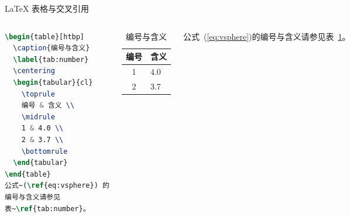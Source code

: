 \documentclass[aspectratio=169]{beamer}
\begin{document}
\begin{frame}[fragile]{\LaTeX{} 表格与交叉引用}
    \begin{columns}[c,onlytextwidth]
\begin{lstlisting}[language=TeX,basicstyle=\ttfamily\footnotesize]
\begin{table}[htbp]
  \caption{编号与含义}
  \label{tab:number}
  \centering
  \begin{tabular}{cl}
    \toprule
    编号 & 含义 \\
    \midrule
    1 & 4.0 \\
    2 & 3.7 \\
    \bottomrule
  \end{tabular}
\end{table}
公式~(\ref{eq:vsphere}) 的
编号与含义请参见
表~\ref{tab:number}。
\end{lstlisting}
        \begin{table}[htpb]
            \centering
            \caption{编号与含义}
            \label{tab:number}
            \begin{tabular}{cl}\toprule
                编号 & 含义 \\\midrule
                1 & 4.0\\
                2 & 3.7\\\bottomrule
            \end{tabular}
        \end{table}
        \normalsize 公式~(\ref{eq:vsphere})的编号与含义请参见表~\ref{tab:number}。
    \end{columns}
\end{frame}
\end{document}
